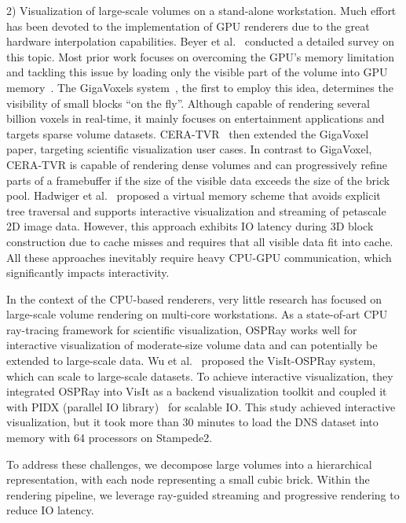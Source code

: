 2) Visualization of large-scale volumes on a stand-alone workstation.
Much effort has been devoted to the implementation of GPU renderers
due to the great hardware interpolation capabilities\cite{feng2015parallel,clyne2007interactive}.
Beyer et al.~\cite{beyer2014survey} conducted a detailed survey on this topic. Most prior work focuses on overcoming the GPU's
memory limitation and tackling this issue by loading only the visible
part of the volume into GPU memory~\cite{li2003empty}. 
The GigaVoxels system~\cite{crassin2007interactive,crassin2009gigavoxels}, the first to employ this idea, determines the visibility of
small blocks ``on the fly''.  
Although capable of rendering several billion voxels in real-time,
it mainly focuses on entertainment applications and targets sparse volume datasets.
CERA-TVR~\cite{engel2011cera} then extended the GigaVoxel paper, 
targeting scientific visualization user cases.
In contrast to GigaVoxel, CERA-TVR is capable of rendering dense volumes
and can progressively refine parts of a framebuffer if the size of the visible
data exceeds the size of the brick pool.
Hadwiger et al.~\cite{hadwiger2012interactive} proposed a virtual memory scheme
that avoids explicit tree traversal and supports interactive visualization and 
streaming of petascale 2D image data. However, this approach exhibits
IO latency during 3D block construction due to cache misses and requires that all
visible data fit into cache. All these approaches inevitably require
heavy CPU-GPU communication, which significantly impacts interactivity. 


In the context of the CPU-based renderers, very little research has focused
on large-scale volume rendering on multi-core workstations.
As a state-of-art CPU ray-tracing framework for scientific visualization,
OSPRay works well for interactive visualization of moderate-size volume data
and can potentially be extended to large-scale data.
Wu et al.~\cite{wu2018visit} proposed the VisIt-OSPRay system, which can scale to
large-scale datasets. To achieve interactive visualization, they integrated OSPRay
into VisIt as a backend visualization toolkit and coupled it with PIDX (parallel IO 
library)~\cite{kumar2011pidx} for scalable IO. 
This study achieved interactive visualization, but it took more than 30 minutes to load the DNS 
dataset into memory with 64 processors on Stampede2.

To address these challenges, we decompose large volumes into a hierarchical 
representation, with each node representing a small cubic brick. Within the rendering pipeline,
we leverage ray-guided streaming and progressive rendering to reduce IO latency. 

